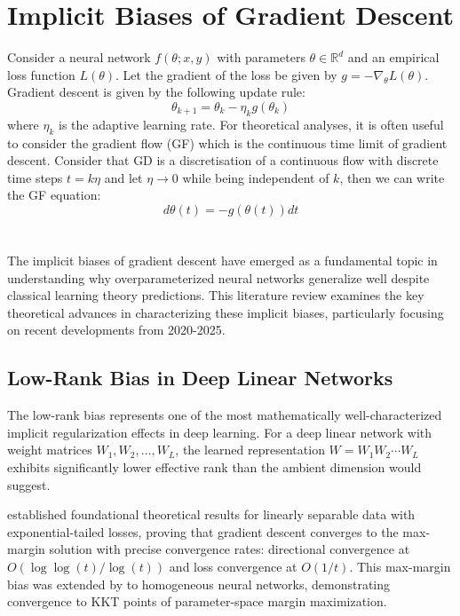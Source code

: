 \documentclass[11pt]{article}
\begin{document}
\section{Implicit Biases of Gradient Descent}
Consider a neural network $f(\theta; x,y)$ with parameters $\theta \in \mathbb{R}^d$ and an empirical loss function $L(\theta)$. Let the gradient of the loss be given by $g = -\nabla_{\theta} L(\theta)$. Gradient descent is given by the following update rule:
\begin{equation}
\theta_{k+1} = \theta_k - \eta_k g(\theta_k)
\end{equation}
where $\eta_k$ is the adaptive learning rate. For theoretical analyses, it is often useful to consider the gradient flow (GF) which is the continuous time limit of gradient descent. Consider that GD is a discretisation of a continuous flow with discrete time steps $t = k\eta$ and let $\eta \to 0$ while being independent of $k$, then we can write the GF equation:
\begin{equation}
d{\theta}(t) = - g(\theta(t)) dt
\end{equation}
\\
\\
The implicit biases of gradient descent have emerged as a fundamental topic in understanding why overparameterized neural networks generalize well despite classical learning theory predictions. This literature review examines the key theoretical advances in characterizing these implicit biases, particularly focusing on recent developments from 2020-2025.

\subsection{Low-Rank Bias in Deep Linear Networks}

The low-rank bias represents one of the most mathematically well-characterized implicit regularization effects in deep learning. For a deep linear network with weight matrices $W_1, W_2, \ldots, W_L$, the learned representation $W = W_1 W_2 \cdots W_L$ exhibits significantly lower effective rank than the ambient dimension would suggest.

\citet{soudry2018implicit} established foundational theoretical results for linearly separable data with exponential-tailed losses, proving that gradient descent converges to the max-margin solution with precise convergence rates: directional convergence at $O(\log \log(t)/\log(t))$ and loss convergence at $O(1/t)$. This max-margin bias was extended by \citet{lyu2019gradient} to homogeneous neural networks, demonstrating convergence to KKT points of parameter-space margin maximization.
\end{document}
